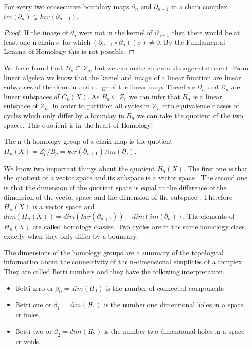 \begin{cor}  For every two consecutive boundary maps $\partial_n$ and $\partial_{n-1}$ in a chain complex $im(\partial_n) \subseteq ker(\partial_{n-1})$. \end{cor}

\begin{proof}
    If the image of $\partial_n$ were not in the kernel of $\partial_{n-1}$ then there would be at least one n-chain $\sigma$ for which $(\partial_{n-1} \circ \partial_n) (\sigma) \ne 0$. By the Fundamental Lemma of Homology this is not possible.
\end{proof}

We have found that $B_n \subseteq Z_n$, but we can make an even stronger statement. From linear algebra \cite{lin-alg-done-right} we know that the kernel and image of a linear function are linear subspaces of the domain and range of the linear map. Therefore $B_n$ and $Z_n$ are linear subspaces of $C_n(X)$. As $B_n \subseteq Z_n$ we can infer that $B_n$ is a linear subspace of $Z_n$. In order to partition all cycles in $Z_n$ into equivalence classes of cycles which only differ by a bounday in $B_n$ we can take the quotient of the two spaces. This quotient is in the heart of Homology!

\begin{defn} The n-th homology group of a chain map is the quotient $H_n(X) = Z_p \big/ B_p = ker(\partial_{n+1})\big/im(\partial_n)$. \end{defn}

We know two important things about the quotient $H_n(X)$. The first one is that the quotient of a vector space and its subspace is a vector space \cite{lin-alg-done-right}. The second one is that the dimension of the quotient space is equal to the difference of the dimension of the vector space and the dimension of the subspace \cite{lin-alg-done-right}. Therefore $H_n(X)$ is a vector space and $dim(H_n(X)) = dim(ker(\partial_{n+1})) - dim(im(\partial_n))$. The elements of $H_n(X)$ are called homology classes. Two cycles are in the same homology class exactly when they only differ by a boundary.

The dimensions of the homology groups are a summary of the topological information about the connectivity of the n-dimensional simplicies of a complex. They are called Betti numbers and they have the following interpretation.

\begin{itemize}
    \item Betti zero or $\beta_0 = dim(H_0)$ is the number of connected components
    \item Betti one  or $\beta_1 = dim(H_1)$ is the number one dimentional holes in a space or holes.
    \item Betti two  or $\beta_2 = dim(H_2)$ is the number two dimentional holes in a space or voids.
\end{itemize}


